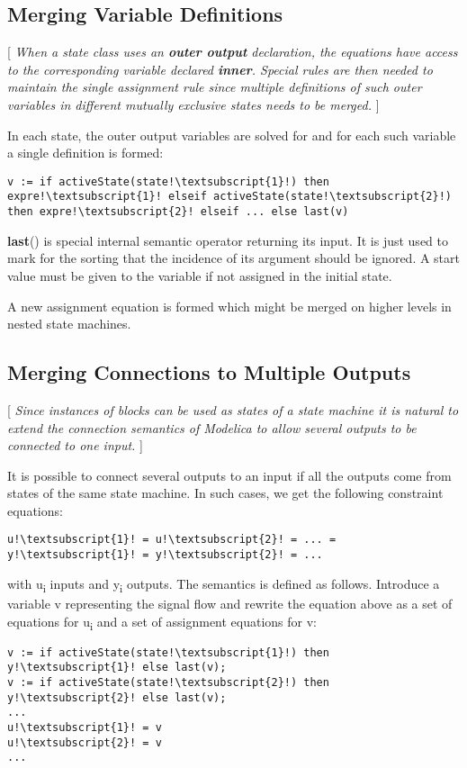 \subsection{Merging Variable Definitions}

{[} \emph{When a state class uses an \textbf{outer output} declaration,
the equations have access to the corresponding variable declared
\textbf{inner}. Special rules are then needed to maintain the single
assignment rule since multiple definitions of such outer variables in
different mutually exclusive states needs to be merged.} {]}

In each state, the outer output variables are solved for and for each
such variable a single definition is formed:

\begin{lstlisting}[language=modelica,escapechar=!]
v := if activeState(state!\textsubscript{1}!) then expre!\textsubscript{1}! elseif activeState(state!\textsubscript{2}!) then expre!\textsubscript{2}! elseif ... else last(v)
\end{lstlisting}

\textbf{last}() is special internal semantic operator returning its
input. It is just used to mark for the sorting that the incidence of its
argument should be ignored. A start value must be given to the variable
if not assigned in the initial state.

A new assignment equation is formed which might be merged on higher
levels in nested state machines.

\subsection{Merging Connections to Multiple Outputs}

{[} \emph{Since instances of blocks can be used as states of a state
machine it is natural to extend the connection semantics of Modelica to
allow several outputs to be connected to one input.} {]}

It is possible to connect several outputs to an input if all the outputs
come from states of the same state machine. In such cases, we get the
following constraint equations:

\begin{lstlisting}[language=modelica,escapechar=!]
u!\textsubscript{1}! = u!\textsubscript{2}! = ... = y!\textsubscript{1}! = y!\textsubscript{2}! = ...
\end{lstlisting}
with u\textsubscript{i} inputs and y\textsubscript{i} outputs. The
semantics is defined as follows. Introduce a variable v representing the
signal flow and rewrite the equation above as a set of equations for
u\textsubscript{i} and a set of assignment equations for v:
\begin{lstlisting}[language=modelica,escapechar=!]
v := if activeState(state!\textsubscript{1}!) then y!\textsubscript{1}! else last(v);
v := if activeState(state!\textsubscript{2}!) then y!\textsubscript{2}! else last(v);
...
u!\textsubscript{1}! = v
u!\textsubscript{2}! = v
...
\end{lstlisting}

